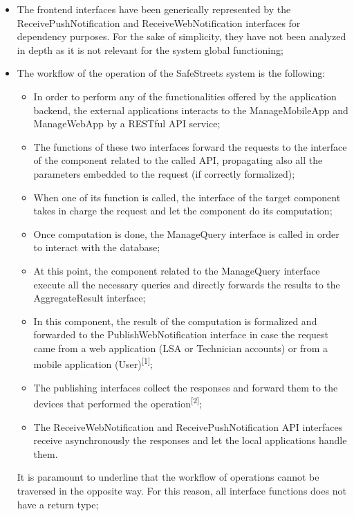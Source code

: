 \begin{itemize}
    \item The frontend interfaces have been generically represented by the ReceivePushNotification and ReceiveWebNotification interfaces for dependency purposes. For the sake of simplicity, they have not been analyzed in depth as it is not relevant for the system global functioning;
    \item The workflow of the operation of the SafeStreets system is the following:
        \begin{itemize}
            \item In order to perform any of the functionalities offered by the application backend, the external applications interacts to the ManageMobileApp and ManageWebApp by a RESTful API service;
            \item The functions of these two interfaces forward the requests to the interface of the component related to the called API, propagating also all the parameters embedded to the request (if correctly formalized);
            \item When one of its function is called, the interface of the target component takes in charge the request and let the component do its computation;
            \item Once computation is done, the ManageQuery interface is called in order to interact with the database;
            \item At this point, the component related to the ManageQuery interface execute all the necessary queries and directly forwards the results to the AggregateResult interface;
            \item In this component, the result of the computation is formalized and forwarded to the PublishWebNotification interface in case the request came from a web application (LSA or Technician accounts) or from a mobile application (User)\textsuperscript{[1]};
            \item The publishing interfaces collect the responses and forward them to the devices that performed the operation\textsuperscript{[2]};
            \item The ReceiveWebNotification and ReceivePushNotification API interfaces receive asynchronously the responses and let the local applications handle them.
        \end{itemize}
    It is paramount to underline that the workflow of operations cannot be traversed in the opposite way. For this reason, all interface functions does not have a return type;

\end{itemize}
